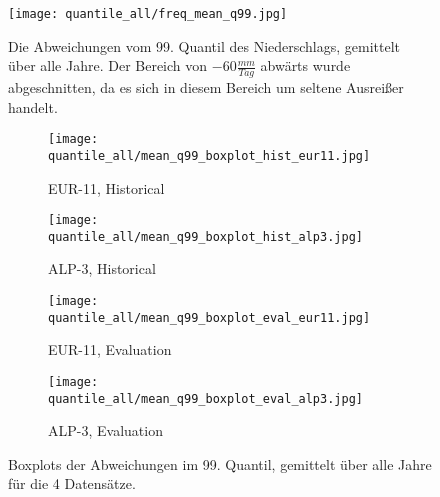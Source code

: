 \begin{figure}
	\texttt{[image: quantile\_all/freq\_mean\_q99.jpg]}
	\caption{Die Abweichungen vom 99. Quantil des Niederschlags, gemittelt über alle Jahre. Der Bereich von $-60\frac{mm}{Tag}$ abwärts wurde abgeschnitten, da es sich in diesem Bereich um seltene Ausreißer handelt.}
	\label{fig:quantile_all}
\end{figure}

\begin{figure}
	\begin{subfigure}{0.49\textwidth}
		\texttt{[image: quantile\_all/mean\_q99\_boxplot\_hist\_eur11.jpg]}
		\caption{EUR-11, Historical}
	\end{subfigure}
	\begin{subfigure}{0.49\textwidth}
		\texttt{[image: quantile\_all/mean\_q99\_boxplot\_hist\_alp3.jpg]}
		\caption{ALP-3, Historical}
	\end{subfigure}
	\begin{subfigure}{0.49\textwidth}
		\texttt{[image: quantile\_all/mean\_q99\_boxplot\_eval\_eur11.jpg]}
		\caption{EUR-11, Evaluation}
	\end{subfigure}
	\begin{subfigure}{0.49\textwidth}
		\texttt{[image: quantile\_all/mean\_q99\_boxplot\_eval\_alp3.jpg]}
		\caption{ALP-3, Evaluation}
	\end{subfigure}
	\caption{Boxplots der Abweichungen im 99. Quantil, gemittelt über alle Jahre für die 4 Datensätze.}
	\label{fig:quantile_all_boxplots}
\end{figure}


